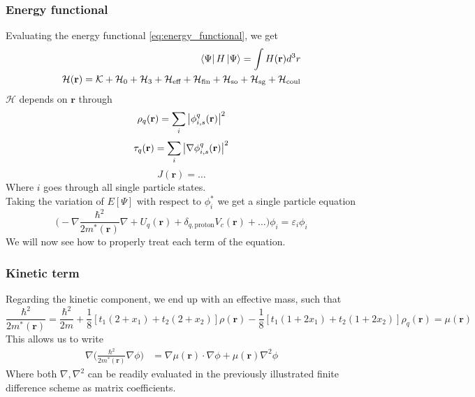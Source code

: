 \subsubsection{Energy functional}
Evaluating the energy functional \ref{eq:energy_functional}, we get
\begin{align}
    \bra{\Psi} H \ket{\Psi} = \int H(\mathbf{r}) d^3 r 
    \\\mathcal H(\mathbf{r}) = \mathcal{K} + \mathcal{H}_0 + \mathcal{H}_3 + \mathcal{H}_\text{eff}+\mathcal{H}_\text{fin}+\mathcal{H}_\text{so} + \mathcal{H}_\text{sg} + \mathcal{H}_\text{coul}
\end{align}
$\mathcal H$ depends on $\mathbf r$ through
\[\rho_q(\mathbf r) = \sum_{i} \abs{\phi^q_{i,s}(\mathbf r)}^2\]
\[\tau_q(\mathbf r) = \sum_{i} \abs{\nabla\phi^q_{i,s}(\mathbf r)}^2\]
\[J(\mathbf r) = \ldots\]
Where $i$ goes through all single particle states.
\\Taking the variation of $E[\Psi]$ with respect to $\phi_i^*$ we get a single particle equation
\begin{equation}
   \bigg(-\nabla \frac{\hbar^2}{2m^*(\mathbf r)} \nabla + U_q(\mathbf r)+\delta_{q, \text{proton}}V_c(\mathbf r)+\ldots\bigg)\phi_i = \varepsilon_i\phi_i 
\end{equation}
We will now see how to properly treat each term of the equation.
\subsubsection{Kinetic term}
Regarding the kinetic component, we end up with an effective mass, such that 
\[\frac{\hbar^2}{2m^*(\mathbf r)} = \frac{\hbar^2}{2m} + \frac 1 8 [t_1(2+x_1)+t_2(2+x_2)]\rho(\mathbf r) - \frac 1 8 [t_1(1+2x_1)+t_2(1+2x_2)]\rho_q(\mathbf r ) = \mu(\mathbf r)\]
This allows us to write
\begin{align}
    \nabla\bigg( \frac{\hbar^2}{2m^*(\mathbf r)} \nabla \phi\bigg)&= \nabla \mu(\mathbf r)\cdot \nabla \phi +\mu(\mathbf r)\nabla^2 \phi 
\end{align}
Where both $\nabla, \nabla^2$ can be readily evaluated in the previously illustrated finite difference scheme as matrix coefficients.
